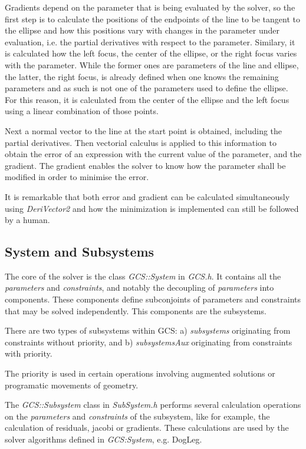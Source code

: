\documentclass[12pt,twoside,a4paper]{book}
\begin{document}
    Gradients depend on the parameter that is being evaluated by the solver, so the first step is to calculate the positions of the endpoints of the line to be tangent to the ellipse and how this positions vary with changes in the parameter under evaluation, i.e. the partial derivatives with respect to the parameter. Similary, it is calculated how the left focus, the center of the ellipse, or the right focus varies with the parameter. While the former ones are parameters of the line and ellipse, the latter, the right focus, is already defined when one knows the remaining parameters and as such is not one of the parameters used to define the ellipse. For this reason, it is calculated from the center of the ellipse and the left focus using a linear combination of those points.

    Next a normal vector to the line at the start point is obtained, including the partial derivatives. Then vectorial calculus is applied to this information to obtain the error of an expression with the current value of the parameter, and the gradient. The gradient enables the solver to know how the parameter shall be modified in order to minimise the error.

    It is remarkable that both error and gradient can be calculated simultaneously using \emph{DeriVector2} and how the minimization is implemented can still be followed by a human.

    \subsection{System and Subsystems}

    The core of the solver is the class \emph{GCS::System} in \emph{GCS.h}. It contains all the \emph{parameters} and \emph{constraints}, and notably the decoupling of \emph{parameters} into components. These components define subconjoints of parameters and constraints that may be solved independently. This components are the subsystems.

    There are two types of subsystems within GCS: a) \emph{subsystems} originating from constraints without priority, and b) \emph{subsystemsAux} originating from constraints with priority.

    The priority is used in certain operations involving augmented solutions or programatic movements of geometry.

    The \emph{GCS::Subsystem} class in \emph{SubSystem.h} performs several calculation operations on the \emph{parameters} and \emph{constraints} of the subsystem, like for example, the calculation of residuals, jacobi or gradients. These calculations are used by the solver algorithms defined in \emph{GCS:System}, e.g. DogLeg.
\end{document}
